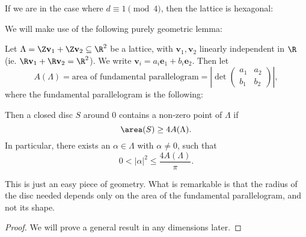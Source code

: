 \documentclass[a4paper]{article}
\begin{document}
If we are in the case where $d \equiv 1 \pmod 4$, then the lattice is hexagonal:
\begin{center}
\end{center}
We will make use of the following purely geometric lemma:
\begin{lemma}
  Let $\Lambda = \Z \mathbf{v}_1 + \Z \mathbf{v}_2 \subseteq \R^2$ be a lattice, with $\mathbf{v}_1, \mathbf{v}_2$ linearly independent in $\R$ (ie. $\R \mathbf{v}_1 + \R \mathbf{v}_2 = \R^2$). We write $\mathbf{v}_i = a_i \mathbf{e}_1 + b_i \mathbf{e}_2$. Then let
  \[
    A(\Lambda) = \text{area of fundamental parallelogram} = \left|\det
    \begin{pmatrix}
      a_1 & a_2\\
      b_1 & b_2
    \end{pmatrix}\right|,
  \]
  where the fundamental parallelogram is the following:
  \begin{center}
  \end{center}
  Then a closed disc $S$ around $0$ contains a non-zero point of $\Lambda$ if
  \[
    \area(S) \geq 4 A(\Lambda).
  \]
  In particular, there exists an $\alpha \in \Lambda$ with $\alpha \not= 0$, such that
  \[
    0 < |\alpha|^2 \leq \frac{4 A(\Lambda)}{\pi}.
  \]
\end{lemma}
This is just an easy piece of geometry. What is remarkable is that the radius of the disc needed depends only on the area of the fundamental parallelogram, and not its shape.

\begin{proof}
  We will prove a general result in any dimensions later.
\end{proof}
\end{document}

